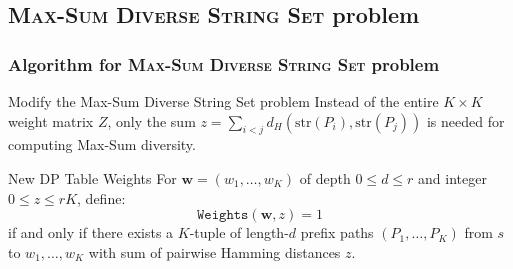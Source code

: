 \documentclass{beamer}
\begin{document}


\subsection{\textsc{Max-Sum Diverse String Set} problem}
\begin{frame}
    \frametitle{Algorithm for \textsc{Max-Sum Diverse String Set} problem}
    \begin{block}{Modify the Max-Sum Diverse String Set problem}
        Instead of the entire \( K \times K \) weight matrix \( Z \), only the sum \( z = \sum_{i<j} d_H(\text{str}(P_i), \text{str}(P_j)) \) is needed for computing Max-Sum diversity.
    \end{block}

    \begin{block}{New DP Table Weights}
        For \( \mathbf{w} = (w_1, \dots, w_K) \) of depth \( 0 \leq d  \leq r\) and integer \( 0 \leq z \leq rK \), define:
        \[
            \texttt{Weights}(\mathbf{w}, z) = 1
        \]
        if and only if there exists a \( K \)-tuple of length-\( d \) prefix paths \( (P_1, \dots, P_K) \) from \( s \) to \( w_1, \dots, w_K \) with sum of pairwise Hamming distances \( z \).
    \end{block}

\end{frame}
\end{document}
